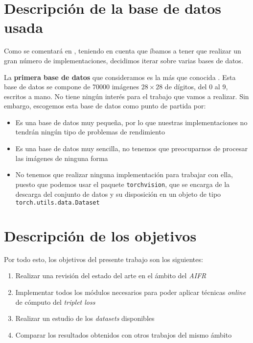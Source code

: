 \section{Descripción de la base de datos usada} \label{isec:base_datos_usada}

Como se comentará en , teniendo en cuenta que íbamos a tener que realizar un gran número de implementaciones, decidimos iterar sobre varias bases de datos.

La \textbf{primera base de datos} que consideramos es la más que conocida  \cite{informatica:mnist}. Esta base de datos se compone de 70000 imágenes $28 \times 28$ de dígitos, del 0 al 9, escritos a mano. No tiene ningún interés para el trabajo que vamos a realizar. Sin embargo, escogemos esta base de datos como punto de partida por:

\begin{itemize}
    \item Es una base de datos muy pequeña, por lo que nuestras implementaciones no tendrán ningún tipo de problemas de rendimiento
    \item Es una base de datos muy sencilla, no tenemos que preocuparnos de procesar las imágenes de ninguna forma
    \item No tenemos que realizar ninguna implementación para trabajar con ella, puesto que podemos usar el paquete \lstinline{torchvision}, que se encarga de la descarga del conjunto de datos y su disposición en un objeto de tipo \lstinline{torch.utils.data.Dataset}
\end{itemize}

\section{Descripción de los objetivos}

Por todo esto, los objetivos del presente trabajo son los siguientes:

\begin{enumerate}
    \item Realizar una revisión del estado del arte en el ámbito del \textit{AIFR}
    \item Implementar todos los módulos necesarios para poder aplicar técnicas \textit{online} de cómputo del \textit{triplet loss}
    \item Realizar un estudio de los \textit{datasets} disponibles
    \item Comparar los resultados obtenidos con otros trabajos del mismo ámbito
\end{enumerate}

